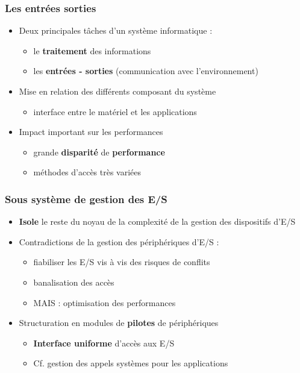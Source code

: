 \begin{frame}
\frametitle{Les entrées sorties}
\begin{itemize}
\item Deux principales tâches d'un système informatique :
\begin{itemize}
\item le \textbf{traitement} des informations
\item les \textbf{entrées - sorties} (communication avec l'environnement)
\end{itemize}
\item Mise en relation des différents composant du système
\begin{itemize}
\item interface entre le matériel et les applications
\end{itemize}
\item Impact important sur les performances
\begin{itemize}
\item grande \textbf{disparité} de \textbf{performance}
\item méthodes d'accès très variées
\end{itemize}
\end{itemize}
\end{frame}

\begin{frame}
\frametitle{Sous système de gestion des E/S}
\begin{itemize}
\item \textbf{Isole} le reste du noyau de la complexité de la gestion des dispositifs d'E/S
\item Contradictions de la gestion des périphériques d'E/S :
\begin{itemize}
\item fiabiliser les E/S vis à vis des risques de conflits
\item banalisation des accès
\item MAIS : optimisation des performances
\end{itemize}
\item Structuration en modules de \textbf{pilotes} de périphériques
\begin{itemize}
\item \textbf{Interface uniforme} d'accès aux E/S
\item Cf. gestion des appels systèmes pour les applications
\end{itemize}
\end{itemize}
\end{frame}


